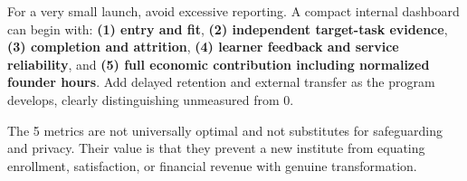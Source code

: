 For a very small launch, avoid excessive reporting. A compact internal dashboard can begin with: \textbf{(1) entry and fit}, \textbf{(2) independent target-task evidence}, \textbf{(3) completion and attrition}, \textbf{(4) learner feedback and service reliability}, and \textbf{(5) full economic contribution including normalized founder hours}. Add delayed retention and external transfer as the program develops, clearly distinguishing unmeasured from 0.

The 5 metrics are not universally optimal and not substitutes for safeguarding and privacy. Their value is that they prevent a new institute from equating enrollment, satisfaction, or financial revenue with genuine transformation.
